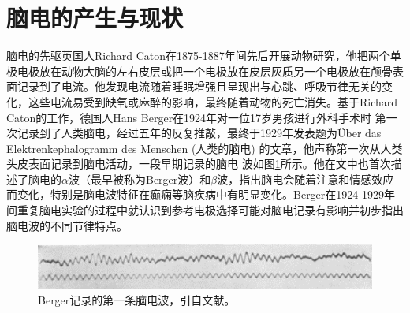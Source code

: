 \thesischapterexordium
\section{脑电的产生与现状}
脑电的先驱英国人Richard Caton在1875-1887年间先后开展动物研究，他把两个单极电极放在动物大脑的左右皮层或把一个电极放在皮层灰质另一个电极放在颅骨表面记录到了电流。他发现电流随着睡眠增强且呈现出与心跳、呼吸节律无关的变化，这些电流易受到缺氧或麻醉的影响，最终随着动物的死亡消失。基于Richard Caton的工作，德国人Hans Berger在1924年对一位17岁男孩进行外科手术时
第一次记录到了人类脑电，经过五年的反复推敲，最终于1929年发表题为Über das Elektrenkephalogramm des Menschen (人类的脑电) 的文章，他声称第一次从人类头皮表面记录到脑电活动，一段早期记录的脑电
波如图\ref{1:wave}所示。他在文中也首次描述了脑电的$\alpha$波（最早被称为Berger波）和$\beta$波，指出脑电会随着注意和情感效应而变化，特别是脑电波特征在癫痫等脑疾病中有明显变化。Berger在1924-1929年间重复脑电实验的过程中就认识到参考电极选择可能对脑电记录有影响并初步指出脑电波的不同节律特点。
\begin{figure}[!h]
	\includegraphics[width=13cm]{pic/xulun/EEGwave.png}
	\caption{Berger记录的第一条脑电波，引自文献。}
	\label{1:wave}
\end{figure}

